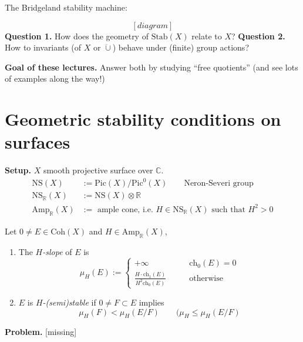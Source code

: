 The Bridgeland stability machine:

$$
[diagram]
$$
\noindent
{\bf Question 1.} How does the geometry of
$\text{Stab}(X)$ relate to $X$?
\noindent
{\bf Question 2.} How to invariants (of $X$
or $\ddot\cup $) behave under (finite) group
actions?

\medskip\noindent
{\bf Goal of these lectures.} Answer both by
studying ``free quotients'' (and see lots of
examples along the way!)

\section{Geometric stability conditions on
surfaces}
\label{gscag-label-001}
\noindent
{\bf Setup.} $X$ smooth projective surface
over $\mathbb{C}$.
$$
\begin{aligned}
\text{NS}(X)&:=\text{Pic}(X)/\text{Pic}^0(X)
\qquad
\text{Neron-Severi group}\\
\text{NS}_{\mathbb{R}}(X)& :=\text{NS}(X)
\otimes \mathbb{R}\\
\text{Amp}_{\mathbb{R}}(X)&:=\text{ ample
cone, i.e. $H \in
\text{NS}_{\mathbb{R}}(X)$ such that $H^2>0$}
\end{aligned}
$$

\begin{definition}
\label{definition-slope-and-stability}
Let $0 \neq  E \in \text{Coh}(X)$ and $H \in
\text{Amp}_{\mathbb{R}}(X)$,
\begin{enumerate}
\item The {\it $H$-slope} of $E$ is
$$
\mu_H(E):=
\begin{cases}
+\infty\qquad &\text{ch}_0(E)=0 \\
\frac{H\cdot \text{ch}_1(E)}{H^2
\text{ch}_0(E)}\qquad &\text{otherwise}
\end{cases}
$$
\item $E$ is {\it $H$-(semi)stable} if $0
\neq  F \subset E$ implies
$$
\mu_H(F) < \mu_H(E/F)\qquad (\mu_H\leq
\mu_H(E/F)
$$
\end{enumerate}
\end{definition}

\begin{example}
\label{example-semistable-condition}

\end{example}

\noindent
{\bf Problem.} [missing]

